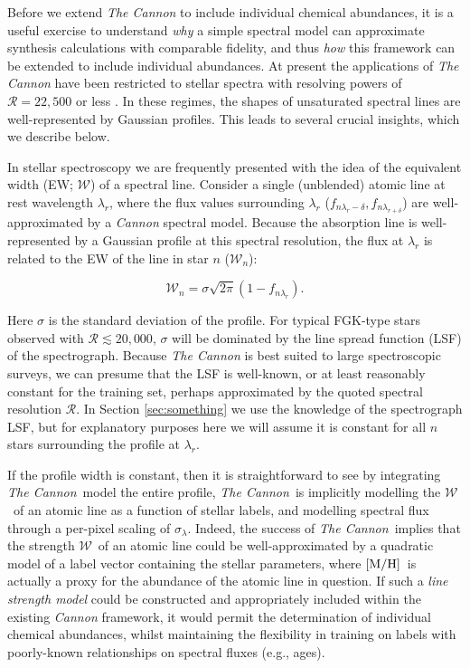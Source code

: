 \documentclass[useAMS,usenatbib]{mn2e}
\newcommand\tc{\textit{The Cannon}}
\newcommand\mh{${\rm [M/H]}$}
\newcommand\ew{$\mathcal{W}$}
\begin{document}
Before we extend \tc{} to include individual chemical abundances, it is a useful
 exercise to understand \textit{why} a simple spectral model can 
approximate synthesis calculations with comparable fidelity, and thus 
\textit{how} this framework can be extended to include individual abundances. At
present the applications of \tc{} have been restricted to stellar spectra with 
resolving powers of $\mathcal{R} = 22,500$ \citep[APOGEE;][]{Ness15a} or less 
\citep[e.g., LAMOST;][]{Ho15}. In these regimes, the shapes of unsaturated 
spectral lines are well-represented by Gaussian profiles. This leads to several 
crucial insights, which we describe below.

In stellar spectroscopy we are frequently presented with the idea of the 
equivalent width (EW; $\mathcal{W}$) of a spectral line. Consider a single 
(unblended) atomic line at rest wavelength $\lambda_r$, where the flux values 
surrounding $\lambda_r$ ($f_{n\lambda_r-{\delta}},f_{n\lambda_{r+\delta}}$) are 
well-approximated by a \textit{Cannon} spectral model. Because the absorption 
line is well-represented by a Gaussian profile at this spectral resolution, the 
flux at $\lambda_r$ is related to the EW of the line in star $n$ ($\mathcal{W}_n$):

\begin{equation}
\mathcal{W}_n = \sigma{}\sqrt{2\pi}(1 - f_{n\lambda_r}).
\label{eq:ew-flux}
\end{equation}

Here $\sigma$ is the standard deviation of the profile. For typical FGK-type
stars observed with $\mathcal{R} \lesssim 20,000$, $\sigma$ will be dominated
by the line spread function (LSF) of the spectrograph. Because \tc{} is best suited
to large spectroscopic surveys, we can presume that the LSF is well-known, or
at least reasonably constant for the training set, perhaps approximated by the 
quoted spectral resolution $\mathcal{R}$. In Section \ref{sec:something} we use
the knowledge of the spectrograph LSF, but for explanatory purposes here we will
assume it is constant for all $n$ stars surrounding the profile at $\lambda_r$.

If the profile width is constant, then it is straightforward to see by integrating
\tc\ model the entire profile, \tc\ is implicitly modelling the \ew\ of an atomic line
as a function of stellar labels, and modelling spectral flux through a per-pixel
scaling of $\sigma_\lambda$. Indeed, the success of \tc\ implies that the 
strength \ew\ of an atomic line could be well-approximated by a quadratic
model of a label vector containing the stellar parameters, where \mh\ is 
actually a proxy for the abundance of the atomic line in question. If such a
\textit{line strength model} could be constructed and appropriately
included within the existing \textit{Cannon} framework, it would permit the 
determination of individual chemical abundances, whilst maintaining the 
flexibility in training on labels with poorly-known relationships on spectral 
fluxes (e.g., ages).
\end{document}
